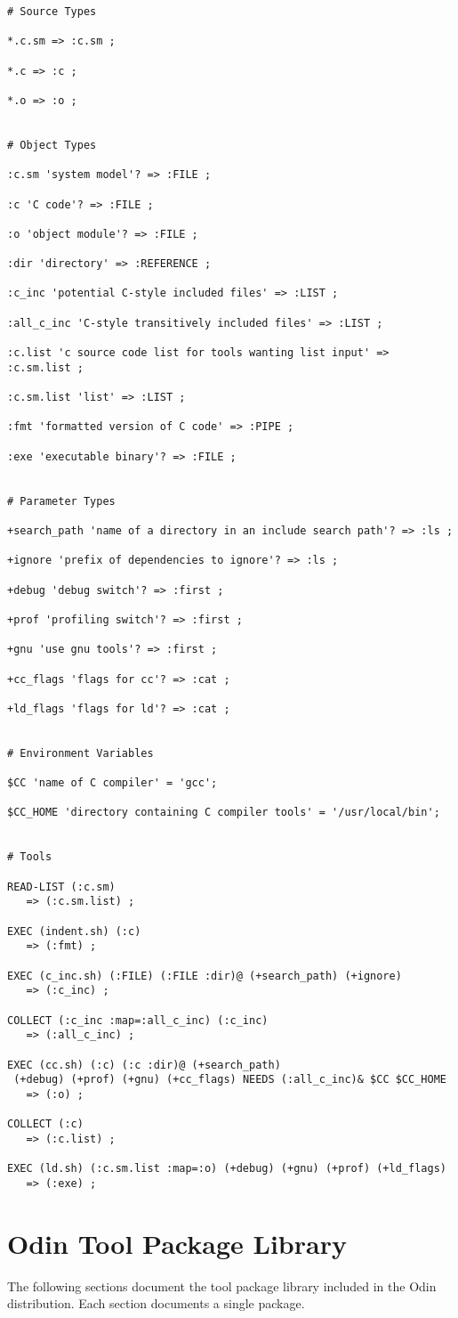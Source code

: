\begin{verbatim}
# Source Types

*.c.sm => :c.sm ;

*.c => :c ;

*.o => :o ;


# Object Types

:c.sm 'system model'? => :FILE ;

:c 'C code'? => :FILE ;

:o 'object module'? => :FILE ;

:dir 'directory' => :REFERENCE ;

:c_inc 'potential C-style included files' => :LIST ;

:all_c_inc 'C-style transitively included files' => :LIST ;

:c.list 'c source code list for tools wanting list input' => :c.sm.list ;

:c.sm.list 'list' => :LIST ;

:fmt 'formatted version of C code' => :PIPE ;

:exe 'executable binary'? => :FILE ;


# Parameter Types

+search_path 'name of a directory in an include search path'? => :ls ;

+ignore 'prefix of dependencies to ignore'? => :ls ;

+debug 'debug switch'? => :first ;

+prof 'profiling switch'? => :first ;

+gnu 'use gnu tools'? => :first ;

+cc_flags 'flags for cc'? => :cat ;

+ld_flags 'flags for ld'? => :cat ;


# Environment Variables

$CC 'name of C compiler' = 'gcc';

$CC_HOME 'directory containing C compiler tools' = '/usr/local/bin';


# Tools

READ-LIST (:c.sm)
   => (:c.sm.list) ;

EXEC (indent.sh) (:c)
   => (:fmt) ;
 
EXEC (c_inc.sh) (:FILE) (:FILE :dir)@ (+search_path) (+ignore)
   => (:c_inc) ;

COLLECT (:c_inc :map=:all_c_inc) (:c_inc)
   => (:all_c_inc) ;

EXEC (cc.sh) (:c) (:c :dir)@ (+search_path)
 (+debug) (+prof) (+gnu) (+cc_flags) NEEDS (:all_c_inc)& $CC $CC_HOME
   => (:o) ;

COLLECT (:c)
   => (:c.list) ;

EXEC (ld.sh) (:c.sm.list :map=:o) (+debug) (+gnu) (+prof) (+ld_flags)
   => (:exe) ;
\end{verbatim}

\chapter{Odin Tool Package Library}

The following sections document the tool package library included in
the Odin distribution.  Each section documents a single package.







